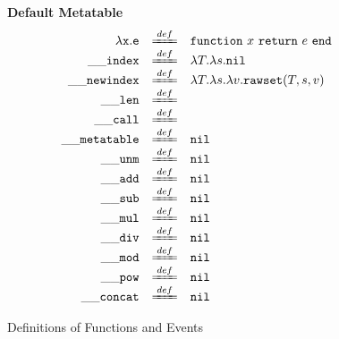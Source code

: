 \documentclass{article}
\begin{document}
\newcommand{\aFunction}[2]{\lambda{#1}.{#2}}


\begin{figure}[P]
\caption{Definitions of Functions and Events}
{\bf Default Metatable}
\label{fig:FW2.1metamethods}
\[
\begin{array}{rclcl}
{\tt \aFunction{x}{e}} & \xlongequal[]{def}  & 
          {\tt function} ~x~{\tt return}~e~{\tt end}\\

  {\tt \_\_index}  & \xlongequal[]{def} & \aFunction{T}{\aFunction{s}{\tt nil}}\\
  
  {\tt \_\_newindex} & \xlongequal[]{def}  & \aFunction{T}{\aFunction{s}{\aFunction{v}{{\tt rawset}(T,s,v)}}}\\

  {\tt \_\_len}   & \xlongequal[]{def}  & \\
       
 
  {\tt \_\_call}   & \xlongequal[]{def}  & \\
         
  
  {\tt \_\_metatable}   & \xlongequal[]{def}  &  {\tt nil}\\

 {\tt \_\_unm}   & \xlongequal[]{def}  & {\tt nil}\\
 {\tt \_\_add}   & \xlongequal[]{def}  & {\tt nil} \\
 {\tt \_\_sub}   & \xlongequal[]{def}  & {\tt nil} \\
 {\tt \_\_mul}   & \xlongequal[]{def}  & {\tt nil} \\
 {\tt \_\_div}   & \xlongequal[]{def}  & {\tt nil} \\
 {\tt \_\_mod}   & \xlongequal[]{def}  & {\tt nil} \\
 {\tt \_\_pow}   & \xlongequal[]{def}  & {\tt nil} \\
 {\tt \_\_concat}   & \xlongequal[]{def}  & {\tt nil} \\
         
\end{array}
\]
\end{figure}






\newcommand{\metaSemanticFull}[6]{{#1}, {#2}, {#3} \Downarrow {#4}, {#5}, {#6}}
\end{document}
